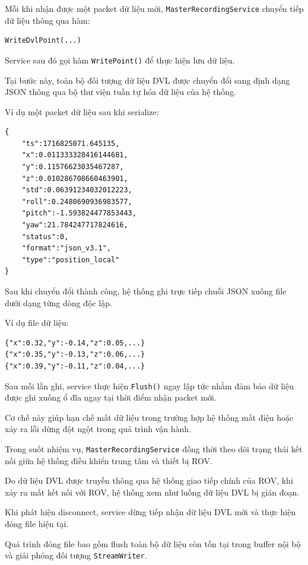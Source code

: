 \documentclass[../DoAn.tex]{subfiles}
\begin{document}
Mỗi khi nhận được một packet dữ liệu mới, \texttt{MasterRecordingService} chuyển tiếp dữ liệu thông qua hàm:

\begin{verbatim}
WriteDvlPoint(...)
\end{verbatim}

Service sau đó gọi hàm \texttt{WritePoint()} để thực hiện lưu dữ liệu.

Tại bước này, toàn bộ đối tượng dữ liệu DVL được chuyển đổi sang định dạng JSON thông qua bộ thư viện tuần tự hóa dữ liệu của hệ thống.

Ví dụ một packet dữ liệu sau khi serialize:

\begin{verbatim}
{
    "ts":1716825071.645135,
    "x":0.011333328416144681,
    "y":0.11576623035467287,
    "z":0.010286708660463901,
    "std":0.06391234032012223,
    "roll":0.2480690936983577,
    "pitch":-1.593824477853443,
    "yaw":21.784247717824616,
    "status":0,
    "format":"json_v3.1",
    "type":"position_local"
}
\end{verbatim}

Sau khi chuyển đổi thành công, hệ thống ghi trực tiếp chuỗi JSON xuống file dưới dạng từng dòng độc lập.

Ví dụ file dữ liệu:

\begin{verbatim}
{"x":0.32,"y":-0.14,"z":0.05,...}
{"x":0.35,"y":-0.13,"z":0.06,...}
{"x":0.39,"y":-0.11,"z":0.04,...}
\end{verbatim}

Sau mỗi lần ghi, service thực hiện \texttt{Flush()} ngay lập tức nhằm đảm bảo dữ liệu được ghi xuống ổ đĩa ngay tại thời điểm nhận packet mới.

Cơ chế này giúp hạn chế mất dữ liệu trong trường hợp hệ thống mất điện hoặc xảy ra lỗi dừng đột ngột trong quá trình vận hành.

Trong suốt nhiệm vụ, \texttt{MasterRecordingService} đồng thời theo dõi trạng thái kết nối giữa hệ thống điều khiển trung tâm và thiết bị ROV.

Do dữ liệu DVL được truyền thông qua hệ thống giao tiếp chính của ROV, khi xảy ra mất kết nối với ROV, hệ thống xem như luồng dữ liệu DVL bị gián đoạn.

Khi phát hiện disconnect, service dừng tiếp nhận dữ liệu DVL mới và thực hiện đóng file hiện tại.

Quá trình đóng file bao gồm flush toàn bộ dữ liệu còn tồn tại trong buffer nội bộ và giải phóng đối tượng \texttt{StreamWriter}.
\end{document}
